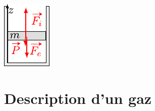 \documentclass[../../main/main.tex]{subfiles}
\begin{document}
\begin{tcb*}[breakable]
\begin{minipage}[c]{.18\linewidth}
\begin{center}
{				\includegraphics[width=\linewidth]{piston_exo}
			}
			\vspace{-15pt}
			\captionsetup{justification=centering}
		\end{center}
	\end{minipage}
\end{tcb*}

\section{Description d'un gaz}
\end{document}
